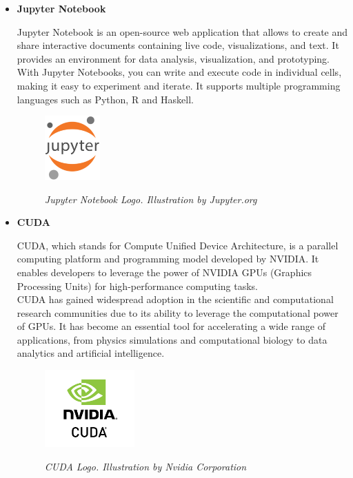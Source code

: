 \begin{itemize}
  \item \textbf{Jupyter Notebook}

    Jupyter Notebook  is an open-source
    web application that allows to create and share interactive documents
    containing live code, visualizations, and text. It provides an environment
    for data analysis, visualization, and prototyping. With Jupyter Notebooks,
    you can write and execute code in individual cells, making it easy to
    experiment and iterate. It supports multiple programming languages such as
    Python, R and Haskell.

    \begin{figure}[H]
      \centering
      \includegraphics[width=0.2\textwidth]{imatges/studies_and_decisions/jupyter-notebook.png}
      \caption[Jupyter Notebook Logo]{\textit{Jupyter Notebook Logo. Illustration by Jupyter.org}}
      {\label{fig:jupyter-logo}}
    \end{figure}

    \newpage

  \item \textbf{CUDA}

    CUDA, which stands for Compute
    Unified Device Architecture, is a parallel computing platform and
    programming model developed by NVIDIA. It enables developers to leverage
    the power of NVIDIA GPUs (Graphics Processing Units) for high-performance
    computing tasks. \\

    CUDA has gained widespread adoption in the scientific and computational
    research communities due to its ability to leverage the computational power
    of GPUs. It has become an essential tool for accelerating a wide range of
    applications, from physics simulations and computational biology to data
    analytics and artificial intelligence.

    \begin{figure}[H]
      \centering
      \begin{adjustbox}{trim=0cm 0.25cm 0cm 0.5cm, clip}
        \includegraphics[width=0.325\textwidth]{imatges/studies_and_decisions/nvidia-cuda.jpg}
      \end{adjustbox}
      \caption[CUDA Logo]{\textit{CUDA Logo. Illustration by Nvidia Corporation}}
      {\label{fig:cuda-logo}}
    \end{figure}


\end{itemize}

